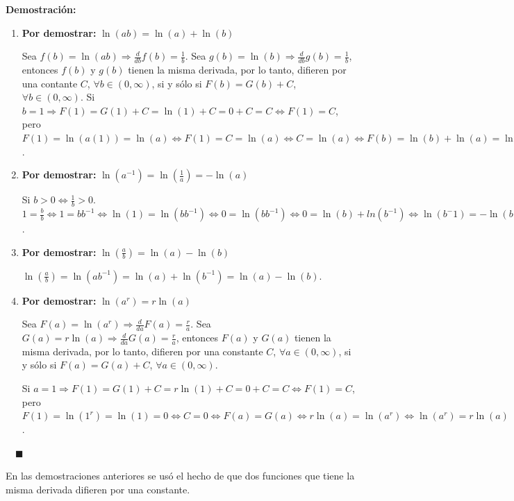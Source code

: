 \documentclass{article}
\numberwithin{equation}{section}
\newcommand{\Col}{\color{ProcessBlue}}
\newenvironment
{proof}
{\par\medskip\noindent\textbf{Demostración:}\rmfamily}
{\Col\hfill$\quad \blacksquare$\vspace{0.5cm}}
\begin{document}
\begin{proof}
    \begin{enumerate}
    \item[a)] \textbf{Por demostrar:} $\ln(ab)=\ln(a)+\ln(b)$
    
    Sea $f(b)=\ln(ab)\Rightarrow\frac{d}{db}f(b)=\frac{1}{b}$. Sea $g(b)=\ln(b)\Rightarrow\frac{d}{db}g(b)=\frac{1}{b}$, entonces $f(b)$ y $g(b)$ tienen la misma derivada, por lo tanto, difieren por una contante $C$, $\forall b\in (0,\infty)$, si y sólo si $F(b)=G(b)+C$, $\forall b\in (0,\infty)$. Si $b=1\Rightarrow F(1)=G(1)+C=\ln(1)+C=0+C=C \Leftrightarrow F(1)=C$, pero $F(1)=\ln(a(1))=\ln(a)\Leftrightarrow F(1)=C=\ln(a)\Leftrightarrow C=\ln(a)\Leftrightarrow F(b)=\ln(b)+\ln(a)=\ln(a)+\ln(b) \therefore \ln(ab)=\ln(a)+\ln(b) \quad \forall b\in (0,\infty)$.
    
    \item[b)] \textbf{Por demostrar:} $\ln(a^{-1})=\ln\left(\frac{1}{a}\right)=-\ln(a)$
    
    Si $b>0\Leftrightarrow\frac{1}{b}>0$. $1=\frac{b}{b}\Leftrightarrow 1=bb^{-1}\Leftrightarrow\ln(1)=\ln(bb^{-1})\Leftrightarrow 0=\ln(bb^{-1})\Leftrightarrow 0=\ln(b)+ln(b^{-1})\Leftrightarrow \ln(b^-1)=-\ln(b)$. 
    
    \item[c)] \textbf{Por demostrar:} $\ln\left(\frac{a}{b}\right)=\ln(a)-\ln(b)$
    
    $\ln\left(\frac{a}{b}\right)=\ln(ab^{-1})=\ln(a)+\ln(b^{-1})=\ln(a)-\ln(b)$.
    
    \item[d)] \textbf{Por demostrar:} $\ln(a^r)=r\ln(a)$
    
    Sea $F(a)=\ln(a^{r})\Rightarrow \frac{d}{da}F(a)=\frac{r}{a}$. Sea $G(a)=r\ln(a)\Rightarrow\frac{d}{da}G(a)=\frac{r}{a}$, entonces $F(a)$ y $G(a)$ tienen la misma derivada, por lo tanto, difieren por una constante $C$, $\forall a\in (0,\infty)$, si y sólo si $F(a)=G(a)+C$, $\forall a\in (0,\infty)$.
    
    Si $a=1 \Rightarrow F(1)=G(1)+C=r\ln(1)+C=0+C=C\Leftrightarrow F(1)=C$, pero $F(1)=\ln(1^{r})=\ln(1)=0\Leftrightarrow C=0\Leftrightarrow F(a)=G(a)\Leftrightarrow r\ln(a)=\ln(a^r)\Leftrightarrow \ln(a^r)=r\ln(a)$. 
    
    \end{enumerate}    
\end{proof}


En las demostraciones anteriores se usó el hecho de que dos funciones que tiene la misma derivada difieren por una constante.
\end{document}
